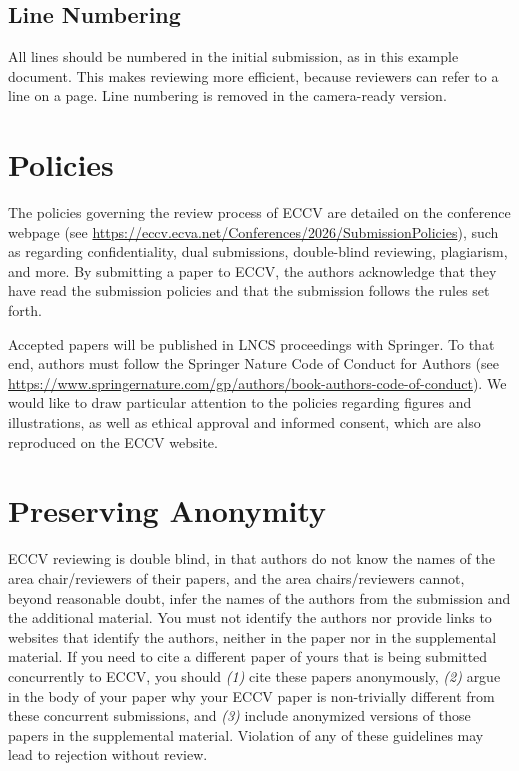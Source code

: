 \documentclass[runningheads]{llncs}
\begin{document}
\subsection{Line Numbering}
\label{sec:line-numbering}
All lines should be numbered in the initial submission, as in this example document. 
This makes reviewing more efficient, because reviewers can refer to a line on a page. 
Line numbering is removed in the camera-ready version.


\section{Policies}
The policies governing the review process of ECCV \ECCVyear{} are detailed on the conference webpage (see \url{ https://eccv.ecva.net/Conferences/2026/SubmissionPolicies}), such as regarding confidentiality, dual submissions, double-blind reviewing, plagiarism, and more. 
By submitting a paper to ECCV, the authors acknowledge that they have read the submission policies and that the submission follows the rules set forth.

Accepted papers will be published in LNCS proceedings with Springer.
To that end, authors must follow the Springer Nature Code of Conduct for Authors (see \url{https://www.springernature.com/gp/authors/book-authors-code-of-conduct}).
We would like to draw particular attention to the policies regarding figures and illustrations, as well as ethical approval and informed consent, which are also reproduced on the ECCV website.


\section{Preserving Anonymity}
\label{sec:blind}
ECCV reviewing is double blind, in that authors do not know the names of the area chair/reviewers of their papers, and the area chairs/reviewers cannot, beyond reasonable doubt, infer the names of the authors from the submission and the additional material. 
You must not identify the authors nor provide links to websites that identify the authors, neither in the paper nor in the supplemental material.
If you need to cite a different paper of yours that is being submitted concurrently to ECCV, you should \emph{(1)} cite these papers anonymously, \emph{(2)} argue in the body of your paper why your ECCV paper is non-trivially different from these concurrent submissions, and \emph{(3)} include anonymized versions of those papers in the supplemental material.
Violation of any of these guidelines may lead to rejection without review. 
\end{document}
